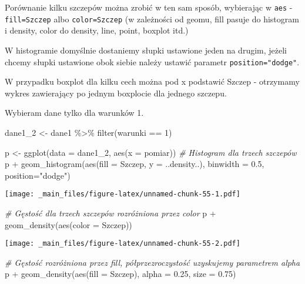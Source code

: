 \documentclass[
]{book}
\newenvironment{Shaded}{\begin{snugshade}}{\end{snugshade}}
\newcommand{\AttributeTok}[1]{\textcolor[rgb]{0.77,0.63,0.00}{#1}}
\newcommand{\CommentTok}[1]{\textcolor[rgb]{0.56,0.35,0.01}{\textit{#1}}}
\newcommand{\DecValTok}[1]{\textcolor[rgb]{0.00,0.00,0.81}{#1}}
\newcommand{\FloatTok}[1]{\textcolor[rgb]{0.00,0.00,0.81}{#1}}
\newcommand{\FunctionTok}[1]{\textcolor[rgb]{0.00,0.00,0.00}{#1}}
\newcommand{\NormalTok}[1]{#1}
\newcommand{\OtherTok}[1]{\textcolor[rgb]{0.56,0.35,0.01}{#1}}
\newcommand{\SpecialCharTok}[1]{\textcolor[rgb]{0.00,0.00,0.00}{#1}}
\newcommand{\StringTok}[1]{\textcolor[rgb]{0.31,0.60,0.02}{#1}}
\begin{document}
Porównanie kilku szczepów można zrobić w ten sam sposób, wybierając w \texttt{aes} - \texttt{fill=Szczep} albo \texttt{color=Szczep} (w zależności od geomu, fill pasuje do histogram i density, color do density, line, point, boxplot itd.)

W histogramie domyślnie dostaniemy słupki ustawione jeden na drugim, jeżeli chcemy słupki ustawione obok siebie należy ustawić parametr \texttt{position="dodge"}.

W przypadku boxplot dla kilku cech można pod x podstawić Szczep - otrzymamy wykres zawierający po jednym boxplocie dla jednego szczepu.

Wybieram dane tylko dla warunków 1.

\begin{Shaded}
\begin{Highlighting}[]
\NormalTok{dane1\_2 }\OtherTok{\textless{}{-}}\NormalTok{ dane1 }\SpecialCharTok{\%\textgreater{}\%} \FunctionTok{filter}\NormalTok{(warunki }\SpecialCharTok{==} \DecValTok{1}\NormalTok{)}

\NormalTok{p }\OtherTok{\textless{}{-}} \FunctionTok{ggplot}\NormalTok{(}\AttributeTok{data =}\NormalTok{ dane1\_2, }\FunctionTok{aes}\NormalTok{(}\AttributeTok{x =}\NormalTok{ pomiar))}
\CommentTok{\# Histogram dla trzech szczepów}
\NormalTok{p }\SpecialCharTok{+} \FunctionTok{geom\_histogram}\NormalTok{(}\FunctionTok{aes}\NormalTok{(}\AttributeTok{fill =}\NormalTok{ Szczep, }\AttributeTok{y =}\NormalTok{ ..density..), }\AttributeTok{binwidth =} \FloatTok{0.5}\NormalTok{, }
                   \AttributeTok{position=}\StringTok{"dodge"}\NormalTok{)}
\end{Highlighting}
\end{Shaded}

\texttt{[image: \_main\_files/figure-latex/unnamed-chunk-55-1.pdf]}

\begin{Shaded}
\begin{Highlighting}[]
\CommentTok{\# Gęstość dla trzech szczepów rozróżniona przez color}
\NormalTok{p }\SpecialCharTok{+} \FunctionTok{geom\_density}\NormalTok{(}\FunctionTok{aes}\NormalTok{(}\AttributeTok{color =}\NormalTok{ Szczep))}
\end{Highlighting}
\end{Shaded}

\texttt{[image: \_main\_files/figure-latex/unnamed-chunk-55-2.pdf]}

\begin{Shaded}
\begin{Highlighting}[]
\CommentTok{\# Gęstość rozróżniona przez fill, półprzezroczystość uzyskujemy parametrem alpha}
\NormalTok{p }\SpecialCharTok{+} \FunctionTok{geom\_density}\NormalTok{(}\FunctionTok{aes}\NormalTok{(}\AttributeTok{fill =}\NormalTok{ Szczep), }\AttributeTok{alpha =} \FloatTok{0.25}\NormalTok{, }\AttributeTok{size =} \FloatTok{0.75}\NormalTok{)}
\end{Highlighting}
\end{Shaded}
\end{document}
